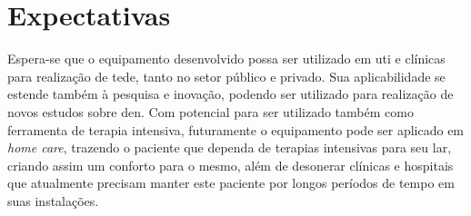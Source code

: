 \section{Expectativas}

Espera-se que o equipamento desenvolvido possa ser utilizado em \ac{uti} e clínicas para realização de \ac{tede}, tanto no setor público e privado. Sua aplicabilidade se estende também à pesquisa e inovação, podendo ser utilizado para realização de novos estudos sobre \ac{den}. Com potencial para ser utilizado também como ferramenta de terapia intensiva, futuramente o equipamento pode ser aplicado em \textit{home care}, trazendo o paciente que dependa de terapias intensivas para seu lar, criando assim um conforto para o mesmo, além de desonerar clínicas e hospitais que atualmente precisam manter este paciente por longos períodos de tempo em suas instalações.